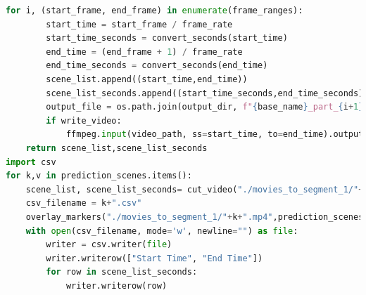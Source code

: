 \documentclass[12pt]{report}
\begin{document}
\begin{lstlisting}[language=Python,caption={Autoshot Shot Boundary Extraction Code}]
    for i, (start_frame, end_frame) in enumerate(frame_ranges):
        start_time = start_frame / frame_rate
        start_time_seconds = convert_seconds(start_time)
        end_time = (end_frame + 1) / frame_rate
        end_time_seconds = convert_seconds(end_time)
        scene_list.append((start_time,end_time))
        scene_list_seconds.append((start_time_seconds,end_time_seconds))
        output_file = os.path.join(output_dir, f"{base_name}_part_{i+1}.mp4")
        if write_video:
            ffmpeg.input(video_path, ss=start_time, to=end_time).output(output_file).run()
    return scene_list,scene_list_seconds
import csv
for k,v in prediction_scenes.items():
	scene_list, scene_list_seconds= cut_video("./movies_to_segment_1/"+k+".mp4",prediction_scenes[k].tolist())
	csv_filename = k+".csv"
	overlay_markers("./movies_to_segment_1/"+k+".mp4",prediction_scenes[k].tolist(),k)
	with open(csv_filename, mode='w', newline="") as file:
		writer = csv.writer(file)
		writer.writerow(["Start Time", "End Time"])
		for row in scene_list_seconds:
			writer.writerow(row)
	\end{lstlisting}
\end{document}
